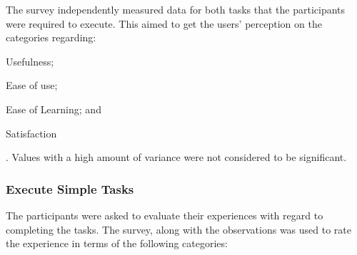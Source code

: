 \documentclass[12pt,a4paper]{report}
\begin{document}
The survey independently measured data for both tasks that the participants were
required to execute. This aimed to get the users' perception on the categories
regarding: \begin{inparaenum}[(i)] \item Usefulness; \item Ease of use; \item
Ease of Learning; and \item Satisfaction \end{inparaenum}. Values with a high
amount of variance were not considered to be significant.\\

\subsubsection{Execute Simple Tasks}
The participants were asked to evaluate their experiences with regard to
completing the tasks. The survey, along with the observations was used to
rate the experience in terms of the following categories:
\end{document}
